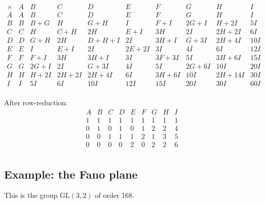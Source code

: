 \documentclass[11pt,oneside]{article}
\newcommand{\GL}{\mathrm{GL}}
\newcommand{\thinplus}{\!+\!}
\begin{document}
$$
\begin{array}{r|rrrrrrrrr}
\times & A & B & C & D & E & F & G & H & I \\
\hline
A & A & B & C & D & E & F & G & H & I \\
B & B & B\thinplus G & H & G\thinplus H & I & F\thinplus I & 2G\thinplus I & H\thinplus 2I & 5I \\
C & C & H & C\thinplus H & 2H & E\thinplus I & 3H & 2I & 2H\thinplus 2I & 6I \\
D & D & G\thinplus H & 2H & D\thinplus H\thinplus I & 2I & 3H\thinplus I & G\thinplus 3I & 2H\thinplus 4I & 10I \\
E & E & I & E\thinplus I & 2I & 2E\thinplus 2I & 3I & 4I & 6I & 12I \\
F & F & F\thinplus I & 3H & 3H\thinplus I & 3I & 3F\thinplus 3I & 5I & 3H\thinplus 6I & 15I \\
G & G & 2G\thinplus I & 2I & G\thinplus 3I & 4I & 5I & 2G\thinplus 6I & 10I & 20I \\
H & H & H\thinplus 2I & 2H\thinplus 2I & 2H\thinplus 4I & 6I & 3H\thinplus 6I & 10I & 2H\thinplus 14I & 30I \\
I & I & 5I & 6I & 10I & 12I & 15I & 20I & 30I & 60I \\
\end{array}
$$

After row-reduction:
$$
\begin{array}{rrrrrrrrr}
 A & B & C & D & E & F & G & H & I \\
\hline
1 & 1 & 1 & 1 & 1 & 1 & 1 & 1 & 1 \\
0 & 1 & 0 & 1 & 0 & 1 & 2 & 2 & 4 \\
0 & 0 & 1 & 1 & 1 & 2 & 1 & 3 & 5 \\
0 & 0 & 0 & 0 & 2 & 0 & 2 & 2 & 6 \\
\end{array}
$$

\subsection{Example: the Fano plane}

This is the group $\GL(3, 2)$ of order 168.
\end{document}
